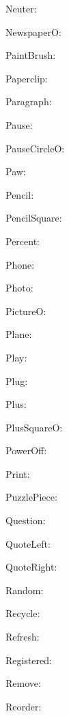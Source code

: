 \documentclass{article}
\begin{document}
      Neuter: \faNeuter\ 

      NewspaperO: \faNewspaperO\ 

      PaintBrush: \faPaintBrush\ 

      Paperclip: \faPaperclip\ 

      Paragraph: \faParagraph\ 

      Pause: \faPause\ 

      PauseCircleO: \faPauseCircleO\ 

      Paw: \faPaw\ 

      Pencil: \faPencil\ 

      PencilSquare: \faPencilSquare\ 

      Percent: \faPercent\ 

      Phone: \faPhone\ 

      Photo: \faPhoto\ 

      PictureO: \faPictureO\ 

      Plane: \faPlane\ 

      Play: \faPlay\ 

      Plug: \faPlug\ 

      Plus: \faPlus\ 

      PlusSquareO: \faPlusSquareO\ 

      PowerOff: \faPowerOff\ 

      Print: \faPrint\ 

      PuzzlePiece: \faPuzzlePiece\ 

      Question: \faQuestion\ 

      QuoteLeft: \faQuoteLeft\ 

      QuoteRight: \faQuoteRight\ 

      Random: \faRandom\ 

      Recycle: \faRecycle\ 

      Refresh: \faRefresh\ 

      Registered: \faRegistered\ 

      Remove: \faRemove\ 

      Reorder: \faReorder\ 
\end{document}
